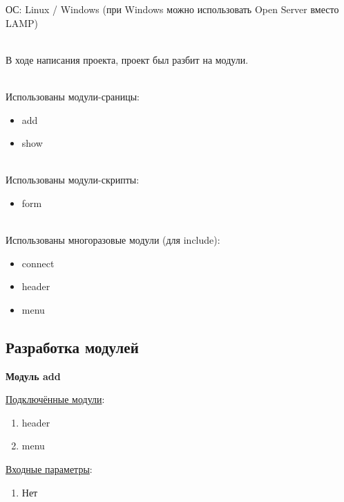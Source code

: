 ОС: Linux / Windows (при Windows можно использовать Open Server вместо LAMP)

\hspace{0pt}\\

В ходе написания проекта, проект был разбит на модули.

\hspace{0pt}\\

Использованы модули-сраницы: 

\begin{itemize}
    \item add
    \item show
\end{itemize}

\hspace{0pt}\\

Использованы модули-скрипты: 

\begin{itemize}
    \item form
\end{itemize}

\hspace{0pt}\\

Использованы многоразовые модули (для include): 

\begin{itemize}
    \item connect
    \item header
    \item menu
\end{itemize}

\newpage

\subsection{Разработка модулей}

\textbf{Модуль add}

\underline{Подключённые модули}:

\begin{enumerate}
    \item header
    \item menu
\end{enumerate}

\underline{Входные параметры}:

\begin{enumerate}
    \item Нет
\end{enumerate}

